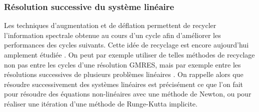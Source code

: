     \subsubsection{Résolution successive du système linéaire}
    Les techniques d'augmentation et de déflation permettent de recycler l'information spectrale obtenue au cours d'un cycle afin d'améliorer les performances des cycles suivants.
    Cette idée de recyclage est encore aujourd'hui amplement étudiée \cite{JolivetTournier2016}.
    On peut par exemple utiliser de telles méthodes de recyclage non pas entre les cycles d'une résolution GMRES, mais par exemple entre les résolutions successives de plusieurs problèmes linéaires \cite{Gaul2014}.
    On rappelle alors que résoudre successivement des systèmes linéaires est précisément ce que l'on fait pour résoudre des équations non-linéaires avec une méthode de Newton, ou pour réaliser une itération d'une méthode de Runge-Kutta implicite.
